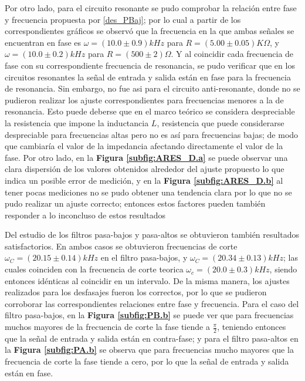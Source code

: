\documentclass[11pt,a4paper]{article}
\begin{document}
Por otro lado, para el circuito resonante se pudo comprobar la relación entre fase y frecuencia propuesta por \eqref{des_PBaj}; por lo cual a partir de los correspondientes gráficos se observó que la frecuencia en la que ambas señales se encuentran en fase es $\omega = (10.0 \pm 0.9)kHz$ para $R=(5.00 \pm 0.05)K\Omega$, y $\omega = (10.0 \pm 0.2)kHz$ para $R=(500 \pm 2)\Omega$. Y al coincidir cada frecuencia de fase con su correspondiente frecuencia de resonancia, se pudo verificar que en los circuitos resonantes la señal de entrada y salida están en fase para la frecuencia de resonancia. Sin embargo, no fue asi para el circuito anti-resonante, donde no se pudieron realizar los ajuste correspondientes para frecuencias menores a la de resonancia. Esto puede deberse que en el marco teórico se considera despreciable la resistencia que impone la inductancia $L$, resistencia que puede considerarse despreciable para frecuencias altas pero no es así para frecuencias bajas; de modo que cambiaría el valor de la impedancia afectando directamente el valor de la fase. Por otro lado, en la \textbf{Figura \ref{subfig:ARES_D.a}} se puede observar una clara dispersión de los valores obtenidos alrededor del ajuste propuesto lo que indica un posible error de medición, y en la \textbf{Figura \ref{subfig:ARES_D.b}} al tener pocas mediciones no se pudo obtener una tendencia clara por lo que no se pudo realizar un ajuste correcto; entonces estos factores pueden también responder a lo inconcluso de estos resultados

Del estudio de los filtros pasa-bajos y pasa-altos se obtuvieron también resultados satisfactorios. En ambos casos se obtuvieron frecuencias de corte $\omega_C= (20.15 \pm 0.14) kHz$ en el filtro pasa-bajos, y $\omega_C= (20.34 \pm 0.13)kHz$; las cuales coinciden con la frecuencia de corte teorica $\omega_c = (20.0 \pm 0.3) kHz$, siendo entonces idénticas al coincidir en un intervalo. De la misma manera, los ajustes realizados para los desfasajes fueron los correctos, por lo que se pudieron corroborar las correspondientes relaciones entre fase y frecuencia. Para el caso del filtro pasa-bajos, en la \textbf{Figura \ref{subfig:PB.b}} se puede ver que para frecuencias muchos mayores de la frecuencia de corte la fase tiende a $\frac{\pi}{2}$, teniendo entonces que la señal de entrada y salida están en contra-fase; y para el filtro pasa-altos en la \textbf{Figura \ref{subfig:PA.b}} se observa que para frecuencias mucho mayores que la frecuencia de corte la fase tiende a cero, por lo que la señal de entrada y salida están en fase.
\end{document}
